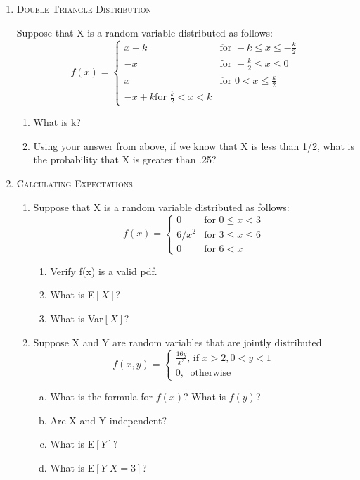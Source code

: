 \documentclass[11pt,letterpaper]{article}
\numberwithin{equation}{section}
\begin{document}
\begin{enumerate}[I]
\item \textsc{Double Triangle Distribution} 

Suppose that X is a random variable distributed as follows:
$$f(x)=\begin{cases} x+k & \text{for } -k\leq x \leq -\frac{k}{2}\\  -x & \text{for } -\frac{k}{2} \leq x \leq 0\\ x  & \text{for } 0<x\leq\frac{k}{2}\\ -x+k \text{for } \frac{k}{2}<x<k \end{cases}$$
\begin{enumerate}[1)]
\item What is k?

\item Using your answer from above, if we know that X is less than 1/2, what is the probability that X is greater than .25? 
\end{enumerate}

\pagebreak
\item \textsc{Calculating Expectations}
\begin{enumerate}[1)]

\item Suppose that X is a random variable distributed as follows:
$$f(x)=\begin{cases} 0 & \text{for } 0\leq x < 3 \\ 6/x^2  & \text{for }  3\leq x\leq 6\\ 0 &\text{for } 6< x
\end{cases}$$
\begin{enumerate}[1)]
\item Verify f(x) is a valid pdf. %
\item What is E$[X]$? %
\item What is Var$[X]$?%

\end{enumerate}
\item Suppose X and Y are random variables that are jointly distributed 
$$f(x,y)=\begin{cases} \frac{16y}{x^3} \text{, if }x>2, 0<y<1\\ 0, \ \text{ otherwise }\end{cases}$$

\begin{enumerate}[a)]
\item What is the formula for $f(x)$?  What is $f(y)$? 
\item Are X and Y independent? %
\item What is E$[Y]$? 
\item What is E$[Y|X=3]$? 
\end{enumerate}


\end{enumerate}
\end{enumerate}
\end{document}
